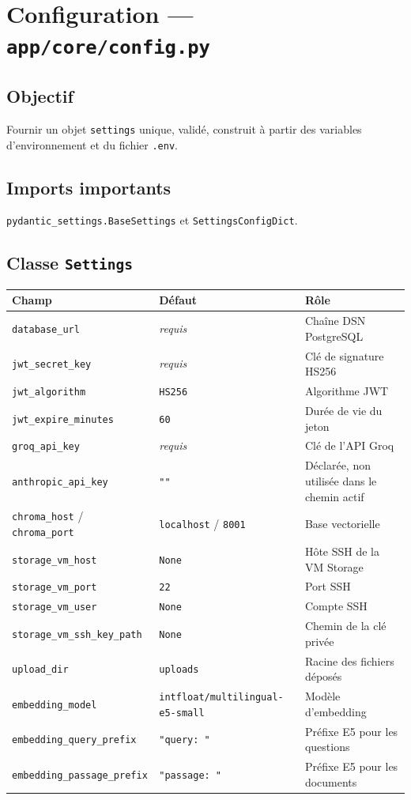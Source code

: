 \documentclass[11pt,a4paper]{report}
\newcommand{\file}[1]{\texttt{\small #1}}
\newcommand{\fn}[1]{\texttt{\small\textcolor{oasisviolet}{#1}}}
\newcommand{\cls}[1]{\texttt{\small\textcolor{oasisblue}{#1}}}
\begin{document}
\section{Configuration --- \file{app/core/config.py}}

\subsection*{Objectif}
Fournir un objet \fn{settings} unique, validé, construit à partir des variables
d'environnement et du fichier \file{.env}.

\subsection*{Imports importants}
\texttt{pydantic\_settings.BaseSettings} et \texttt{SettingsConfigDict}.

\subsection*{Classe \cls{Settings}}

\begin{longtable}{@{}p{4.4cm}p{2.4cm}p{7.9cm}@{}}
\toprule
\textbf{Champ} & \textbf{Défaut} & \textbf{Rôle}\\
\midrule
\endhead
\texttt{database\_url} & \emph{requis} & Chaîne DSN PostgreSQL\\
\texttt{jwt\_secret\_key} & \emph{requis} & Clé de signature HS256\\
\texttt{jwt\_algorithm} & \texttt{HS256} & Algorithme JWT\\
\texttt{jwt\_expire\_minutes} & \texttt{60} & Durée de vie du jeton\\
\texttt{groq\_api\_key} & \emph{requis} & Clé de l'API Groq\\
\texttt{anthropic\_api\_key} & \texttt{""} & Déclarée, non utilisée dans le chemin actif\\
\texttt{chroma\_host} / \texttt{chroma\_port} & \texttt{localhost} / \texttt{8001} & Base vectorielle\\
\texttt{storage\_vm\_host} & \texttt{None} & Hôte SSH de la VM Storage\\
\texttt{storage\_vm\_port} & \texttt{22} & Port SSH\\
\texttt{storage\_vm\_user} & \texttt{None} & Compte SSH\\
\texttt{storage\_vm\_ssh\_key\_path} & \texttt{None} & Chemin de la clé privée\\
\texttt{upload\_dir} & \texttt{uploads} & Racine des fichiers déposés\\
\texttt{embedding\_model} & \texttt{intfloat/multilingual-e5-small} & Modèle d'embedding\\
\texttt{embedding\_query\_prefix} & \texttt{"query: "} & Préfixe E5 pour les questions\\
\texttt{embedding\_passage\_prefix} & \texttt{"passage: "} & Préfixe E5 pour les documents\\
\bottomrule
\end{longtable}
\end{document}
